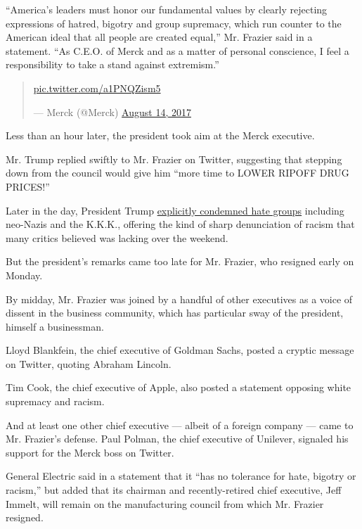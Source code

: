 ``America's leaders must honor our fundamental values by clearly
rejecting expressions of hatred, bigotry and group supremacy, which run
counter to the American ideal that all people are created equal,'' Mr.
Frazier said in a statement. ``As C.E.O. of Merck and as a matter of
personal conscience, I feel a responsibility to take a stand against
extremism.''

\begin{quote}
\href{https://t.co/a1PNQZism5}{pic.twitter.com/a1PNQZism5}

--- Merck (@Merck)
\href{https://twitter.com/Merck/status/897065338566791169?ref_src=twsrc\%5Etfw}{August
14, 2017}
\end{quote}

Less than an hour later, the president took aim at the Merck executive.

Mr. Trump replied swiftly to Mr. Frazier on Twitter, suggesting that
stepping down from the council would give him ``more time to LOWER
RIPOFF DRUG PRICES!''

Later in the day, President Trump
\href{https://www.nytimes.com/2017/08/14/us/politics/trump-charlottesville-protest.html}{explicitly
condemned hate groups} including neo-Nazis and the K.K.K., offering the
kind of sharp denunciation of racism that many critics believed was
lacking over the weekend.

But the president's remarks came too late for Mr. Frazier, who resigned
early on Monday.

By midday, Mr. Frazier was joined by a handful of other executives as a
voice of dissent in the business community, which has particular sway of
the president, himself a businessman.

Lloyd Blankfein, the chief executive of Goldman Sachs, posted a cryptic
message on Twitter, quoting Abraham Lincoln.

Tim Cook, the chief executive of Apple, also posted a statement opposing
white supremacy and racism.

And at least one other chief executive --- albeit of a foreign company
--- came to Mr. Frazier's defense. Paul Polman, the chief executive of
Unilever, signaled his support for the Merck boss on Twitter.

General Electric said in a statement that it ``has no tolerance for
hate, bigotry or racism,'' but added that its chairman and
recently-retired chief executive, Jeff Immelt, will remain on the
manufacturing council from which Mr. Frazier resigned.

